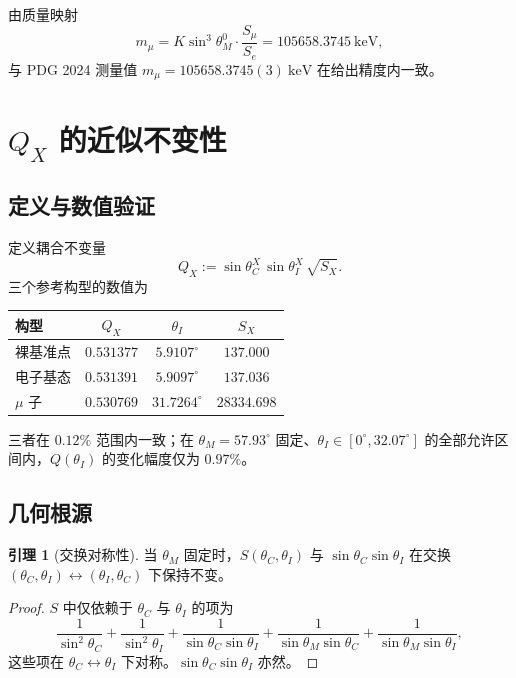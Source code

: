 \documentclass[12pt,a4paper]{article}
\theoremstyle{definition}
\newtheorem{lemma}{引理}
\begin{document}
由质量映射
\begin{equation}
m_\mu=K\sin^3\theta_M^0\cdot\frac{S_\mu}{S_e}=105658.3745~\mathrm{keV},
\end{equation}
与 PDG 2024 测量值 $m_\mu=105658.3745(3)~\mathrm{keV}$ 在给出精度内一致。

\section{$Q_X$ 的近似不变性}

\subsection{定义与数值验证}

定义耦合不变量
\begin{equation}
Q_X:=\sin\theta_C^X\,\sin\theta_I^X\,\sqrt{S_X}.
\end{equation}
三个参考构型的数值为

\begin{center}
\begin{tabular}{@{}lccc@{}}
\toprule
构型 & $Q_X$ & $\theta_I$ & $S_X$ \\
\midrule
裸基准点 & $0.531377$ & $5.9107^\circ$ & $137.000$ \\
电子基态 & $0.531391$ & $5.9097^\circ$ & $137.036$ \\
$\mu$ 子 & $0.530769$ & $31.7264^\circ$ & $28334.698$ \\
\bottomrule
\end{tabular}
\end{center}

三者在 $0.12\%$ 范围内一致；在 $\theta_M=57.93^\circ$ 固定、$\theta_I\in[0^\circ,32.07^\circ]$ 的全部允许区间内，$Q(\theta_I)$ 的变化幅度仅为 $0.97\%$。

\subsection{几何根源}

\begin{lemma}[交换对称性]
当 $\theta_M$ 固定时，$S(\theta_C,\theta_I)$ 与 $\sin\theta_C\sin\theta_I$ 在交换 $(\theta_C,\theta_I)\leftrightarrow(\theta_I,\theta_C)$ 下保持不变。
\end{lemma}
\begin{proof}
$S$ 中仅依赖于 $\theta_C$ 与 $\theta_I$ 的项为
\begin{equation*}
\frac{1}{\sin^2\theta_C}+\frac{1}{\sin^2\theta_I}+\frac{1}{\sin\theta_C\sin\theta_I}+\frac{1}{\sin\theta_M\sin\theta_C}+\frac{1}{\sin\theta_M\sin\theta_I},
\end{equation*}
这些项在 $\theta_C\leftrightarrow\theta_I$ 下对称。$\sin\theta_C\sin\theta_I$ 亦然。
\end{proof}
\end{document}
